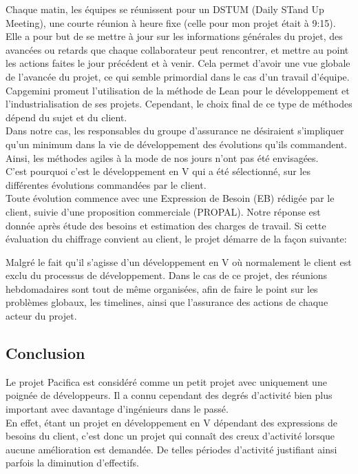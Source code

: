 \documentclass{rapport}
\begin{document}
Chaque matin, les équipes se réunissent pour un DSTUM (Daily STand Up Meeting), une courte réunion à heure fixe (celle pour mon projet était à 9:15). Elle a pour but de se mettre à jour sur les informations générales du projet, des avancées ou retards que chaque collaborateur peut rencontrer, et mettre au point les actions faites le jour précédent et à venir. Cela permet d'avoir une vue globale de l'avancée du projet, ce qui semble primordial dans le cas d'un travail d'équipe.\\

Capgemini promeut l'utilisation de la méthode de Lean pour le développement et l'industrialisation de ses projets. Cependant, le choix final de ce type de méthodes dépend du sujet et du client.\\ 
Dans notre cas, les responsables du groupe d'assurance ne désiraient s'impliquer qu'un minimum dans la vie de développement des évolutions qu'ils commandent. Ainsi, les méthodes agiles à la mode de nos jours n'ont pas été envisagées.\\

C'est pourquoi c'est le développement en V qui a été sélectionné, sur les différentes évolutions commandées par le client.\\


Toute évolution commence avec une Expression de Besoin (EB) rédigée par le client, suivie d'une proposition commerciale (PROPAL). Notre réponse est donnée après étude des besoins et estimation des charges de travail. Si cette évaluation du chiffrage convient au client, le projet démarre de la façon suivante:


Malgré le fait qu'il s'agisse d'un développement en V où normalement le client est exclu du processus de développement. Dans le cas de ce projet, des réunions hebdomadaires sont tout de même organisées, afin de faire le point sur les problèmes globaux, les timelines, ainsi que l'assurance des actions de chaque acteur du projet.

\subsection*{Conclusion}

Le projet Pacifica est considéré comme un petit projet avec uniquement une poignée de développeurs. Il a connu cependant des degrés d'activité bien plus important avec davantage d'ingénieurs dans le passé. \\
En effet, étant un projet en développement en V dépendant des expressions de besoins du client, c'est donc un projet qui connaît des creux d'activité lorsque aucune
amélioration est demandée. De telles périodes d'activité justifiant ainsi parfois la diminution d'effectifs.\\
\end{document}
